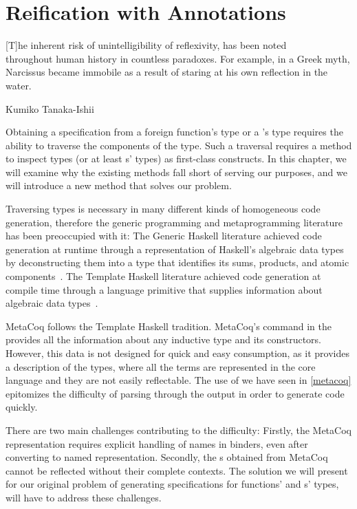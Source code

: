 \chapter{Reification with Annotations}
\label{reified}

\epigraph{
[T]he inherent risk of unintelligibility of reflexivity, has been noted\\ throughout human history in countless paradoxes. For example, in a Greek myth,\\Narcissus became immobile as a result of staring at his own reflection in the water.}{Kumiko Tanaka-Ishii~\cite{tanaka2010semiotics}}

Obtaining a specification from a \gls{foreign function}'s type or a \constructor{}'s type requires the ability to traverse the components of the type. Such a traversal requires a method to inspect types (or at least \constructor{}s' types) as first-class constructs. In this chapter, we will examine why the existing methods fall short of serving our purposes, and we will introduce a new method that solves our problem.

Traversing types is necessary in many different kinds of homogeneous code generation, therefore the generic programming and \gls{metaprogramming} literature has been preoccupied with it: The Generic Haskell literature achieved code generation at runtime through a representation of Haskell's algebraic data types by deconstructing them into a type that identifies its sums, products, and atomic components~\cite{jansson1997, hinze2003chapter}. The Template Haskell literature achieved code generation at compile time through a language \gls{primitive} that supplies information about algebraic data types~\cite{sheard2002template}.

MetaCoq follows the Template Haskell tradition. MetaCoq's  command in the \TemplateMonad{} provides all the information about any inductive type and its constructors. However, this data is not designed for quick and easy consumption, as it provides a  description of the types, where all the terms are represented in the core language and they are not easily reflectable. The use of  we have seen in \autoref{metacoq} epitomizes the difficulty of parsing through the output in order to generate code quickly.

There are two main challenges contributing to the difficulty: Firstly, the MetaCoq representation requires explicit handling of names in binders, even after converting to named representation. Secondly, the s obtained from MetaCoq cannot be reflected without their complete contexts. The solution we will present for our original problem of generating specifications for functions' and \constructor{}s' types, will have to address these challenges.


